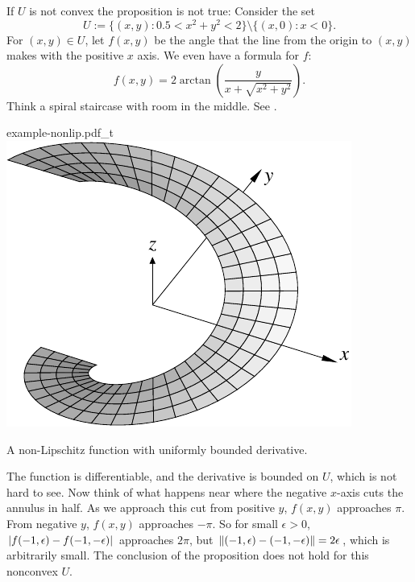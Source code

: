 \begin{example}
If $U$ is not convex the proposition is not true: Consider
the set
\begin{equation*}
U := \bigl\{ (x,y) : 0.5 < x^2+y^2 < 2 \bigr\} \setminus \bigl\{ (x,0) : x <
0 \bigr\} .
\end{equation*}
For $(x,y) \in U$,
let $f(x,y)$ be the angle that the line from the origin to $(x,y)$
makes with the positive $x$ axis.  We even have a formula for $f$:
\begin{equation*}
f(x,y) = 2 \operatorname{arctan}\left( \frac{y}{x+\sqrt{x^2+y^2}}\right) .
\end{equation*}
Think a spiral staircase with room in the middle.  See
.

\begin{myfigureht}
{example-nonlip.pdf_t}
\qquad
\includegraphics{figures/nonlipgraph}
\caption{A non-Lipschitz function with uniformly bounded
derivative.\label{mv:fignonlip}}
\end{myfigureht}

The function is differentiable,
and the derivative is bounded on $U$, which is not hard to see.   Now
think of
what happens near where the negative $x$-axis cuts the annulus in half.
As we approach this cut from positive $y$, $f(x,y)$ approaches $\pi$.
From negative $y$, $f(x,y)$ approaches $-\pi$.
So for small $\epsilon > 0$, $\lvert {f(-1,\epsilon)-f(-1,-\epsilon)} \rvert$
approaches $2\pi$, but $\lVert {(-1,\epsilon)-(-1,-\epsilon)} \rVert = 2\epsilon$,
which is arbitrarily small.  The conclusion of the proposition does not
hold for this nonconvex $U$.
\end{example}

